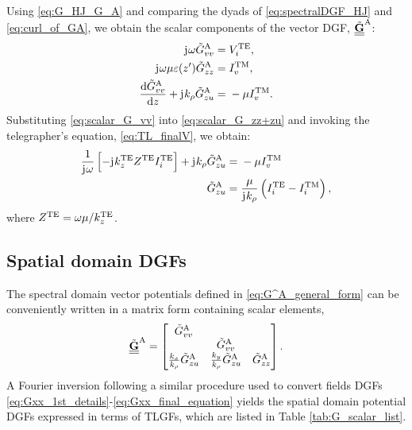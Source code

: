 \documentclass[12pt]{article}
\begin{document}
%
Using \eqref{eq:G_HJ_G_A} and comparing the dyads of \eqref{eq:spectralDGF_HJ} and \eqref{eq:curl_of_GA}, we obtain the scalar components of the vector DGF, $\underline{\underline{\tilde{\mathbf{G}}}}^\mathrm{A}$:
%
\begin{subequations}
  \begin{align}
    \mathrm{j}\mkern1mu \omega  \tilde{G}^\mathrm{A}_{vv} ={}& V_i^{\mathrm{TE}},
    \label{eq:scalar_G_vv}\\
    \mathrm{j}\mkern1mu \omega \mu \varepsilon(z') \tilde{G}^\mathrm{A}_{zz} ={}& I_v^{\mathrm{TM}},
    \label{eq:scalar_G_zz}\\
    \dv{\tilde{G}^\mathrm{A}_{vv}}{z} + \mathrm{j}\mkern1mu k_{\rho} \tilde{G}^\mathrm{A}_{zu} ={}& - \mu I_v^{\mathrm{TM}}.
    \label{eq:scalar_G_zz+zu}
  \end{align}
  \label{eq:components_GA}%
\end{subequations}
%
Substituting \eqref{eq:scalar_G_vv} into \eqref{eq:scalar_G_zz+zu} and invoking the telegrapher's equation, \eqref{eq:TL_finalV}, we obtain:
%
\begin{equation}
  \begin{split}
    \frac{1}{\mathrm{j}\mkern1mu \omega} \left[ -\mathrm{j}\mkern1mu k_z^{\mathrm{TE}} Z^{\mathrm{TE}} I_i^{\mathrm{TE}} \right] + \mathrm{j}\mkern1mu k_{\rho} \tilde{G}^\mathrm{A}_{zu} ={}& - \mu I_v^{\mathrm{TM}} \\
    \tilde{G}^\mathrm{A}_{zu} ={}& \frac{\mu}{\mathrm{j}\mkern1mu k_{\rho}} \left( I_i^{\mathrm{TE}} - I_i^{\mathrm{TM}} \right),
  \end{split}
  \label{eq:scalar_G_zu}
\end{equation}
%
where $Z^{\mathrm{TE}} = \omega \mu/ k_z^{\mathrm{TE}}$.
\subsection{Spatial domain DGFs}
%
The spectral domain vector potentials defined in \eqref{eq:G^A_general_form} can be conveniently written in a matrix form containing scalar elements,
%
\begin{equation}
  \underline{\underline{\tilde{\mathbf{G}}}}^\mathrm{A}
  =
  \begin{bmatrix}
    \tilde{G}^\mathrm{A}_{vv} &  &  \\
     & \tilde{G}^\mathrm{A}_{vv} & \\
     \frac{k_x}{k_{\rho}} \tilde{G}^\mathrm{A}_{zu} & \frac{k_y}{k_{\rho}} \tilde{G}^\mathrm{A}_{zu} & \tilde{G}^\mathrm{A}_{zz}
  \end{bmatrix}
  \label{eq:G_A_matrix_form}.
\end{equation}
%
A Fourier inversion following a similar procedure used to convert fields DGFs \eqref{eq:Gxx_1st_details}-\eqref{eq:Gxx_final_equation} yields the spatial domain potential DGFs expressed in terms of TLGFs, which are listed in Table \ref{tab:G_scalar_list}.
%
\end{document}
